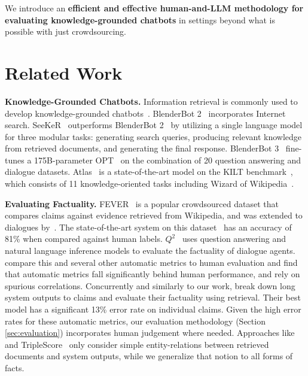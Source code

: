 \documentclass[11pt]{article}
\begin{document}
We introduce an {\bf efficient and effective human-and-LLM methodology for evaluating knowledge-grounded chatbots} in settings beyond what is possible with just crowdsourcing.


\section{Related Work}
\label{sec:related-work}

{\bf Knowledge-Grounded Chatbots.}
Information retrieval is commonly used to develop knowledge-grounded chatbots~\cite{shuster-etal-2021-retrieval-augmentation}.
BlenderBot 2~\cite{chen2021blenderbot} incorporates Internet search. SeeKeR~\cite{shuster-etal-2022-language} outperforms BlenderBot 2~\cite{chen2021blenderbot} by utilizing a single language model for three modular tasks: generating search queries, producing relevant knowledge from retrieved documents, and generating the final response. 
BlenderBot 3~\cite{shuster2022blenderbot} fine-tunes a 175B-parameter OPT~\cite{zhang2022opt} on the combination of 20 question answering and dialogue datasets. 
Atlas~\cite{izacard2022atlas} is a state-of-the-art model on the KILT benchmark~\cite{petroni-etal-2021-kilt}, which consists of 11 knowledge-oriented tasks including Wizard of Wikipedia~\cite{dinan2019wizard}.

{\bf Evaluating Factuality.}
\label{section:related_factuality_evaluation}
FEVER~\cite{thorne-etal-2018-fever} is a popular crowdsourced dataset that compares claims against evidence retrieved from Wikipedia, and was extended to dialogues by~\citet{gupta-etal-2022-dialfact}. The state-of-the-art system on this dataset~\cite{krishna-etal-2022-proofver} has an accuracy of 81\% when compared against human labels.
$Q^2$~\cite{honovich-etal-2021-q2} uses question answering and natural language inference models to evaluate the factuality of dialogue agents.
\citet{dziri-etal-2022-evaluating} compare this and several other automatic metrics to human evaluation and find that automatic metrics fall significantly behind human performance, and rely on spurious correlations.
Concurrently and similarly to our work, \citet{min2023factscore} break down long system outputs to claims and evaluate their factuality using retrieval. Their best model has a significant 13\% error rate on individual claims. Given the high error rates for these automatic metrics, our evaluation methodology (Section \ref{sec:evaluation}) incorporates human judgement where needed.
Approaches like \citet{qian2023optimizing} and TripleScore~\cite{assessing-factual-2019} only consider simple entity-relations between retrieved documents and system outputs, while we generalize that notion to all forms of facts.
\end{document}
